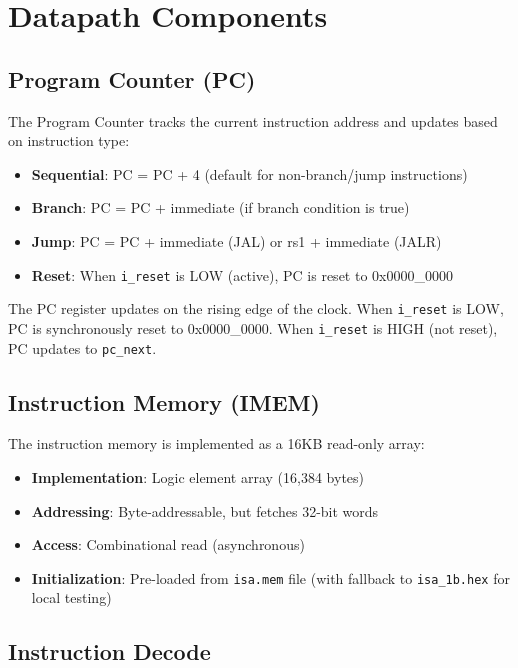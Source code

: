 \section{Datapath Components}

\subsection{Program Counter (PC)}

The Program Counter tracks the current instruction address and updates based on instruction type:

\begin{itemize}
    \item \textbf{Sequential}: PC = PC + 4 (default for non-branch/jump instructions)
    \item \textbf{Branch}: PC = PC + immediate (if branch condition is true)
    \item \textbf{Jump}: PC = PC + immediate (JAL) or rs1 + immediate (JALR)
    \item \textbf{Reset}: When \texttt{i\_reset} is LOW (active), PC is reset to 0x0000\_0000
\end{itemize}

The PC register updates on the rising edge of the clock. When \texttt{i\_reset} is LOW, PC is synchronously reset to 0x0000\_0000. When \texttt{i\_reset} is HIGH (not reset), PC updates to \texttt{pc\_next}.

\subsection{Instruction Memory (IMEM)}

The instruction memory is implemented as a 16KB read-only array:

\begin{itemize}
    \item \textbf{Implementation}: Logic element array (16,384 bytes)
    \item \textbf{Addressing}: Byte-addressable, but fetches 32-bit words
    \item \textbf{Access}: Combinational read (asynchronous)
    \item \textbf{Initialization}: Pre-loaded from \texttt{isa.mem} file (with fallback to \texttt{isa\_1b.hex} for local testing)
\end{itemize}

\subsection{Instruction Decode}

